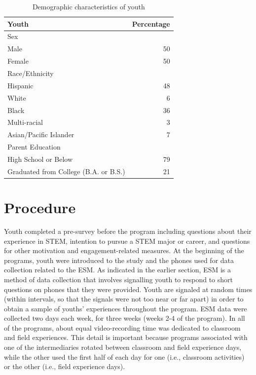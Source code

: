 \documentclass[]{book}
\theoremstyle{definition}
\theoremstyle{definition}
\theoremstyle{definition}
\theoremstyle{remark}
\begin{document}
\begin{table}

\caption{\label{tab:unnamed-chunk-3}Demographic characteristics of youth}
\centering
\begin{tabular}[t]{lr}
\toprule
Youth & Percentage\\
\midrule
Sex & \\
Male & 50\\
Female & 50\\
Race/Ethnicity & \\
Hispanic & 48\\
\addlinespace
White & 6\\
Black & 36\\
Multi-racial & 3\\
Asian/Pacific Islander & 7\\
Parent Education & \\
\addlinespace
High School or Below & 79\\
Graduated from College (B.A. or B.S.) & 21\\
\bottomrule
\end{tabular}
\end{table}

\section{Procedure}\label{procedure}

Youth completed a pre-survey before the program including questions
about their experience in STEM, intention to pursue a STEM major or
career, and questions for other motivation and engagement-related
measures. At the beginning of the programs, youth were introduced to the
study and the phones used for data collection related to the ESM. As
indicated in the earlier section, ESM is a method of data collection
that involves signalling youth to respond to short questions on phones
that they were provided. Youth are signaled at random times (within
intervals, so that the signals were not too near or far apart) in order
to obtain a sample of youths' experiences throughout the program. ESM
data were collected two days each week, for three weeks (weeks 2-4 of
the program). In all of the programs, about equal video-recording time
was dedicated to classroom and field experiences. This detail is
important because programs associated with one of the intermediaries
rotated between classroom and field experience days, while the other
used the first half of each day for one (i.e., classroom activities) or
the other (i.e., field experience days).
\end{document}
